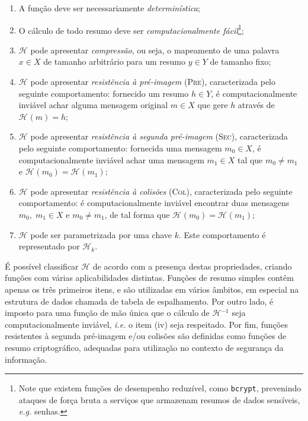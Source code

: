 \documentclass{ufsctex/ufsctex}
\newcommand{\hh}{\mathcal{H}}
\newcommand{\hash}[2][]{\mathcal{H}^{#1} (#2)}
\begin{document}
\begin{enumerate}[label= (\roman*)]

  \item A função deve ser necessariamente \emph{determinística};

  \item O cálculo de todo resumo deve ser \emph{computacionalmente
      fácil}\footnote{Note que existem funções de desempenho reduzível, como
        \texttt{bcrypt}, prevenindo ataques de força bruta a serviços que
        armazenam resumos de dados sensíveis, \emph{e.g.} senhas.};

  \item $\hh{}$ pode apresentar \emph{compressão}, ou seja, o mapeamento de
      uma palavra $x \in X$ de tamanho arbitrário para um resumo $y \in Y$
        de tamanho fixo;

  \item $\hh{}$ pode apresentar \emph{resistência à pré-imagem} (\textsc{Pre}),
      caracterizada pelo seguinte comportamento: fornecido um resumo $h \in Y$,
        é computacionalmente inviável achar alguma mensagem original $m \in X$
        que gere $h$ através de $\hash{m} = h$;

  \item $\hh{}$ pode apresentar \emph{resistência à segunda pré-imagem}
      (\textsc{Sec}), caracterizada pelo seguinte comportamento: fornecida uma
        mensagem $m_0 \in X$, é computacionalmente inviável achar uma mensagem
        $m_1 \in X$ tal que $m_0 \neq m_1$ e $\hash{m_0} = \hash{m_1}$;

  \item $\hh{}$ pode apresentar \emph{resistência à colisões} (\textsc{Col}),
      caracterizada pelo seguinte comportamento: é computacionalmente inviável
        encontrar duas mensagens $m_0, \; m_1 \in X$ e $m_0 \neq
        m_1$, de tal forma que $\hash{m_0} = \hash{m_1}$;

  \item $\hh{}$ pode ser parametrizada por uma chave $k$. Este comportamento
      é representado por $\hh{}_k$.

\end{enumerate}

É possível classificar $\hh{}$ de acordo com a presença destas propriedades,
criando funções com várias aplicabilidades distintas. Funções de resumo simples
contêm apenas os três primeiros itens, e são utilizadas em vários âmbitos, em
especial na estrutura de dados chamada de tabela de espalhamento. Por outro
lado, é imposto para uma função de mão única que o cálculo de $\hh{}^{-1}$ seja
computacionalmente inviável, \emph{i.e.} o item (iv) seja respeitado. Por fim,
funções resistentes à segunda pré-imagem e/ou colisões são definidas como
funções de resumo criptográfico, adequadas para utilização no contexto de
segurança da informação.
\end{document}
